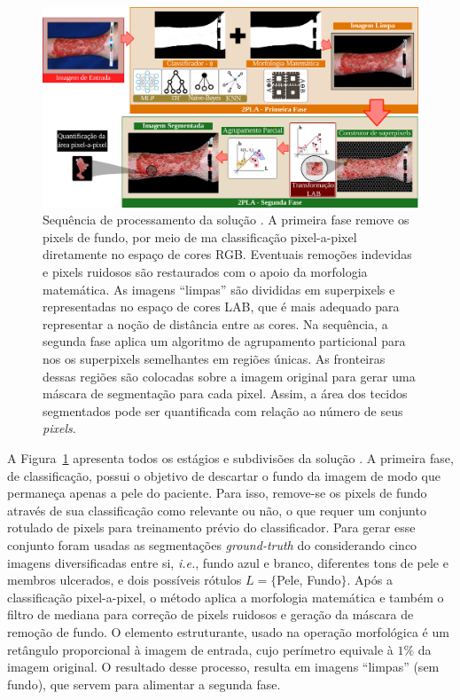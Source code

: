 \begin{figure}[!htb]
\centering
\includegraphics[scale=.63]{_fig/pipeline.png}
\caption[Sequência de processamento da solução \system]{Sequência de processamento da solução \system.
A primeira fase remove os pixels de fundo, por meio de ma classificação pixel-a-pixel diretamente no espaço de cores RGB.
Eventuais remoções indevidas e pixels ruidosos são restaurados com o apoio da morfologia matemática.
As imagens ``limpas'' são divididas em superpixels e representadas no espaço de cores LAB, que é mais adequado para representar a noção de distância entre as cores.
Na sequência, a segunda fase aplica um algoritmo de agrupamento particional para nos os superpixels semelhantes em regiões únicas.
As fronteiras dessas regiões são colocadas sobre a imagem original para gerar uma máscara de segmentação para cada pixel. 
Assim, a área dos tecidos segmentados pode ser quantificada com relação ao número de seus \textit{pixels}.}
\label{fig:system}
\end{figure}

A Figura~\ref{fig:system} apresenta todos os estágios e subdivisões da solução \system.
A primeira fase, de classificação, possui o objetivo de descartar o fundo da imagem de modo que permaneça apenas a pele do paciente.
Para isso, remove-se os pixels de fundo através de sua classificação como relevante ou não, o que requer um conjunto rotulado de pixels para treinamento prévio do classificador.
Para gerar esse conjunto foram usadas as segmentações \textit{ground-truth} do \dataset considerando cinco imagens diversificadas entre si, \textit{i.e.}, fundo azul e branco, diferentes tons de pele e membros ulcerados, e dois possíveis rótulos $L = \{$Pele, Fundo$\}$.
Após a classificação pixel-a-pixel, o método \system aplica a morfologia matemática e também o filtro de mediana para correção de pixels ruidosos e geração da máscara de remoção de fundo.
O elemento estruturante, usado na operação morfológica é um retângulo proporcional à imagem de entrada, cujo perímetro equivale à $1\%$ da imagem original.
O resultado desse processo, resulta em imagens ``limpas'' (sem fundo), que servem para alimentar a segunda fase.


